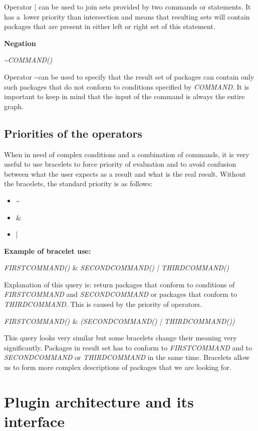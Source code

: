 Operator | can be used to join sets provided by two commands or statements. It has a~lower priority
than intersection and means that resulting sets will contain packages that are present in either
left or right set of this statement.

\textbf{Negation}

\textit{\textasciitilde COMMAND()}

Operator \textasciitilde\space can be used to specify that the result set of packages can contain only such
packages that do not conform to conditions specified by \textit{COMMAND}. It is important
to keep in mind that the input of the command is always the entire graph.

\subsection*{Priorities of the operators}

When in need of complex conditions and a combination of commands, it is very useful to use bracelets
to force priority of evaluation and to avoid confusion between what the user expects as a result and
what is the real result. Without the bracelets, the standard priority is as follows:

\begin{itemize}
  \item \textasciitilde
  \item \&
  \item |
\end{itemize}

\textbf{Example of bracelet use:}

\textit{FIRSTCOMMAND() $\&$ SECONDCOMMAND() | THIRDCOMMAND()}

Explanation of this query is: return packages that conform to conditions of \textit{FIRSTCOMMAND}
and \textit{SECONDCOMMAND} or packages that conform to \textit{THIRDCOMMAND}. This is caused
by the priority of operators.

\textit{FIRSTCOMMAND() $\&$ (SECONDCOMMAND() | THIRDCOMMAND())}

This query looks very similar but some bracelets change their meaning very significantly.
Packages in result set has to conform to \textit{FIRSTCOMMAND} and to \textit{SECONDCOMMAND} or 
\textit{THIRDCOMMAND} in the same time. Bracelets allow us to form more complex descriptions of
packages that we are looking for.

\section{Plugin architecture and its interface}

